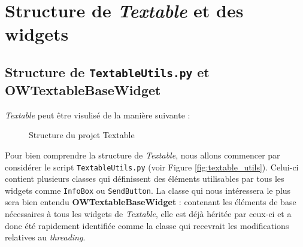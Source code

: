 \documentclass{article}
\begin{document}
\section{Structure de \textit{Textable} et des widgets}

\subsection{Structure de \texttt{TextableUtils.py} et \textbf{OWTextableBaseWidget}}

\textit{Textable} peut être visulisé de la manière suivante :
\vspace{5mm}


\begin{figure}[h]
    \centering
    \caption{Structure du projet Textable}
    \label{fig:textable_tree}
\end{figure}
\vspace{5mm}

Pour bien comprendre la structure de \textit{Textable}, nous allons commencer par considérer le script \texttt{TextableUtils.py} (voir Figure \ref{fig:textable_utils}). Celui-ci contient plusieurs classes qui définissent des éléments utilisables par tous les widgets comme \texttt{InfoBox} ou \texttt{SendButton}. La classe qui nous intéressera le plus sera bien entendu \textbf{OWTextableBaseWidget} : contenant les éléments de base nécessaires à tous les widgets de \textit{Textable}, elle est déjà héritée par ceux-ci et a donc été rapidement identifiée comme la classe qui recevrait les modifications relatives au \textit{threading}.
\end{document}
